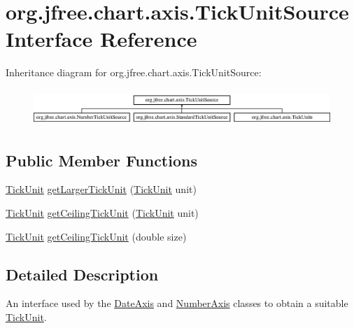 \hypertarget{interfaceorg_1_1jfree_1_1chart_1_1axis_1_1_tick_unit_source}{}\section{org.\+jfree.\+chart.\+axis.\+Tick\+Unit\+Source Interface Reference}
\label{interfaceorg_1_1jfree_1_1chart_1_1axis_1_1_tick_unit_source}
Inheritance diagram for org.\+jfree.\+chart.\+axis.\+Tick\+Unit\+Source\+:\begin{figure}[H]
\begin{center}
\leavevmode
\includegraphics[height=1.393035cm]{interfaceorg_1_1jfree_1_1chart_1_1axis_1_1_tick_unit_source}
\end{center}
\end{figure}
\subsection*{Public Member Functions}
\begin{DoxyCompactItemize}
\item 
\mbox{\hyperlink{classorg_1_1jfree_1_1chart_1_1axis_1_1_tick_unit}{Tick\+Unit}} \mbox{\hyperlink{interfaceorg_1_1jfree_1_1chart_1_1axis_1_1_tick_unit_source_ada1fecd32d2e0ff584a7d2a55ffc349a}{get\+Larger\+Tick\+Unit}} (\mbox{\hyperlink{classorg_1_1jfree_1_1chart_1_1axis_1_1_tick_unit}{Tick\+Unit}} unit)
\item 
\mbox{\hyperlink{classorg_1_1jfree_1_1chart_1_1axis_1_1_tick_unit}{Tick\+Unit}} \mbox{\hyperlink{interfaceorg_1_1jfree_1_1chart_1_1axis_1_1_tick_unit_source_a38db8c401c916244f48a758a8e8d469f}{get\+Ceiling\+Tick\+Unit}} (\mbox{\hyperlink{classorg_1_1jfree_1_1chart_1_1axis_1_1_tick_unit}{Tick\+Unit}} unit)
\item 
\mbox{\hyperlink{classorg_1_1jfree_1_1chart_1_1axis_1_1_tick_unit}{Tick\+Unit}} \mbox{\hyperlink{interfaceorg_1_1jfree_1_1chart_1_1axis_1_1_tick_unit_source_a875d23e3610749f233950f61a855360d}{get\+Ceiling\+Tick\+Unit}} (double size)
\end{DoxyCompactItemize}


\subsection{Detailed Description}
An interface used by the \mbox{\hyperlink{classorg_1_1jfree_1_1chart_1_1axis_1_1_date_axis}{Date\+Axis}} and \mbox{\hyperlink{classorg_1_1jfree_1_1chart_1_1axis_1_1_number_axis}{Number\+Axis}} classes to obtain a suitable \mbox{\hyperlink{classorg_1_1jfree_1_1chart_1_1axis_1_1_tick_unit}{Tick\+Unit}}. 


